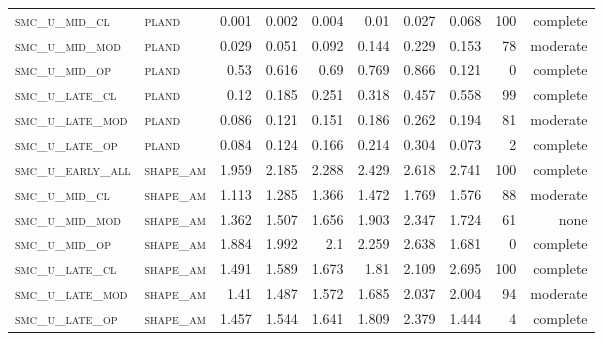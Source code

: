 \begin{landscape}
\begin{center}
\begin{footnotesize}
\begin{longtable}{llrrrrr|rrr}
\textsc{smc\_u\_mid\_cl   } & \textsc{pland     }   & 0.001    & 0.002    & 0.004    & 0.01     & 0.027    & 0.068         & 100           & complete        \\
\textsc{smc\_u\_mid\_mod  } & \textsc{pland     }   & 0.029    & 0.051    & 0.092    & 0.144    & 0.229    & 0.153         & 78            & moderate        \\
\textsc{smc\_u\_mid\_op   } & \textsc{pland     }   & 0.53     & 0.616    & 0.69     & 0.769    & 0.866    & 0.121         & 0             & complete            \\
\textsc{smc\_u\_late\_cl  } & \textsc{pland     }   & 0.12     & 0.185    & 0.251    & 0.318    & 0.457    & 0.558         & 99            & complete        \\
\textsc{smc\_u\_late\_mod } & \textsc{pland     }   & 0.086    & 0.121    & 0.151    & 0.186    & 0.262    & 0.194         & 81            & moderate        \\
\textsc{smc\_u\_late\_op  } & \textsc{pland     }   & 0.084    & 0.124    & 0.166    & 0.214    & 0.304    & 0.073         & 2             & complete        \\
\textsc{smc\_u\_early\_all} & \textsc{shape\_am }   & 1.959    & 2.185    & 2.288    & 2.429    & 2.618    & 2.741         & 100           & complete        \\
\textsc{smc\_u\_mid\_cl   } & \textsc{shape\_am }   & 1.113    & 1.285    & 1.366    & 1.472    & 1.769    & 1.576         & 88            & moderate        \\
\textsc{smc\_u\_mid\_mod  } & \textsc{shape\_am }   & 1.362    & 1.507    & 1.656    & 1.903    & 2.347    & 1.724         & 61            & none        \\
\textsc{smc\_u\_mid\_op   } & \textsc{shape\_am }   & 1.884    & 1.992    & 2.1      & 2.259    & 2.638    & 1.681         & 0             & complete            \\
\textsc{smc\_u\_late\_cl  } & \textsc{shape\_am }   & 1.491    & 1.589    & 1.673    & 1.81     & 2.109    & 2.695         & 100           & complete        \\
\textsc{smc\_u\_late\_mod } & \textsc{shape\_am }   & 1.41     & 1.487    & 1.572    & 1.685    & 2.037    & 2.004         & 94            & moderate        \\
\textsc{smc\_u\_late\_op  } & \textsc{shape\_am }   & 1.457    & 1.544    & 1.641    & 1.809    & 2.379    & 1.444         & 4             & complete        \\

\end{longtable}
\end{footnotesize}
\end{center}
\end{landscape}
